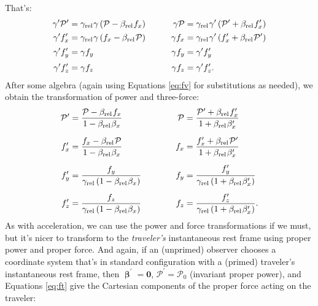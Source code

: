 \documentclass[12pt]{article}
\renewcommand{\vv}[1]{\mathbf{#1}}
\newcommand{\vvbeta}{\bm{\upbeta}}
\begin{document}
That's:
\begin{equation*}
\begin{aligned}
\gamma^\prime \mathcal{P}^\prime &= \gamma_{\textrm{rel}} \mkern1mu \gamma \left( \mathcal{P} - \beta_{\textrm{rel}} \mkern1mu f_x \right) \qquad & \gamma \mathcal{P} &= \gamma_{\textrm{rel}} \mkern1mu \gamma^\prime \left( \mathcal{P}^\prime + \beta_{\textrm{rel}} \mkern1mu f^\prime_x \right) \\[1pt]
\gamma^\prime f_x^\prime &= \gamma_{\textrm{rel}} \mkern1mu \gamma \left( f_x - \beta_{\textrm{rel}} \mkern1mu \mathcal{P} \right)  & \gamma f_x &= \gamma_{\textrm{rel}} \mkern1mu \gamma^\prime \left( f^\prime_x + \beta_{\textrm{rel}} \mkern1mu \mathcal{P}^\prime \right) \\[2pt]
\gamma^\prime f_y^\prime &= \gamma f_y & \gamma f_y &= \gamma^\prime f_y^\prime \\[2pt]
\gamma^\prime f_z^\prime &= \gamma f_z & \gamma f_z &= \gamma^\prime f_z^\prime.
\end{aligned}
\end{equation*}
After some algebra (again using Equations \ref{eq:fv} for substitutions as needed), we obtain the transformation of power and three-force:
\begin{equation}\label{eq:ft}
\begin{aligned}
\mathcal{P}^\prime &= \dfrac{\mathcal{P} - \beta_{\textrm{rel}} \mkern1mu f_x}{1 - \beta_{\textrm{rel}} \mkern1mu \beta_x} & \mathcal{P} &= \dfrac{\mathcal{P}^\prime + \beta_{\textrm{rel}} \mkern1mu f_x^\prime}{1 + \beta_{\textrm{rel}} \mkern1mu \beta_x^\prime} \\[6pt]
f_x^\prime &= \dfrac{f_x - \beta_{\textrm{rel}} \mkern1mu \mathcal{P} }{1 - \beta_{\textrm{rel}} \mkern1mu \beta_x} & f_x &= \dfrac{ f^\prime_x + \beta_{\textrm{rel}} \mkern1mu \mathcal{P}^\prime }{1 + \beta_{\textrm{rel}} \mkern1mu \beta^\prime_x} \\[5pt]
f_y^\prime &= \dfrac{f_y}{\gamma_{\textrm{rel}} \left( 1 - \beta_{\textrm{rel}} \mkern1mu \beta_x \right) } \qquad \quad & f_y &= \dfrac{f^\prime_y}{\gamma_{\textrm{rel}} \left( 1 + \beta_{\textrm{rel}} \mkern1mu \beta^\prime_x \right) } \\[5pt]
f_z^\prime &= \dfrac{f_z}{\gamma_{\textrm{rel}} \left( 1 - \beta_{\textrm{rel}} \mkern1mu \beta_x \right) } & f_z &= \dfrac{f^\prime_z}{\gamma_{\textrm{rel}} \left( 1 + \beta_{\textrm{rel}} \mkern1mu \beta^\prime_x \right) } .
\end{aligned}
\end{equation}
As with acceleration, we can use the power and force transformations if we must, but it's nicer to transform to the \emph{traveler's} instantaneous rest frame using proper power and proper force. And again, if an (unprimed) observer chooses a coordinate system that's in standard configuration with a (primed) traveler's instantaneous rest frame, then $\vvbeta^\prime = \vv 0$, $\mathcal{P}^\prime = \mathcal{P}_0$ (invariant proper power), and Equations \ref{eq:ft} give the Cartesian components of the proper force acting on the traveler:
\end{document}
